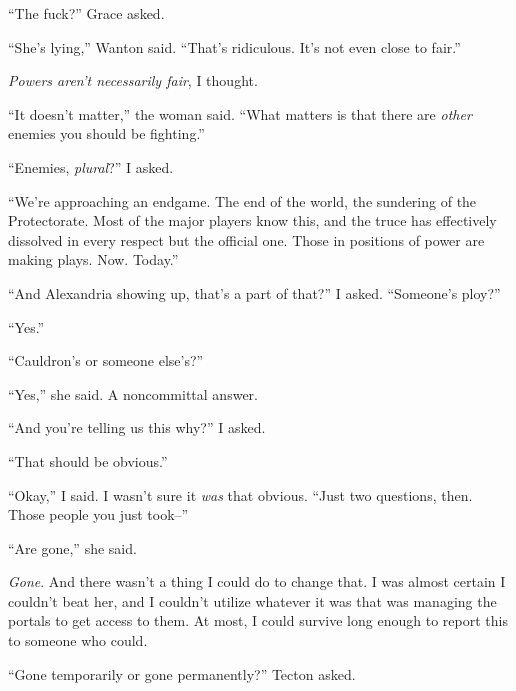 ``The fuck?'' Grace asked.



``She's lying,'' Wanton said.  ``That's ridiculous.  It's not even close to fair.''



\emph{Powers aren't necessarily fair}, I thought.



``It doesn't matter,'' the woman said.  ``What matters is that there are \emph{other} enemies you should be fighting.''



``Enemies, \emph{plural}?'' I asked.



``We're approaching an endgame.  The end of the world, the sundering of the Protectorate.  Most of the major players know this, and the truce has effectively dissolved in every respect but the official one.  Those in positions of power are making plays.  Now.  Today.''



``And Alexandria showing up, that's a part of that?''  I asked.  ``Someone's ploy?''



``Yes.''



``Cauldron's or someone else's?''



``Yes,'' she said.  A noncommittal answer.



``And you're telling us this why?'' I asked.



``That should be obvious.''



``Okay,'' I said.  I wasn't sure it \emph{was} that obvious.  ``Just two questions, then.  Those people you just took--''



``Are gone,'' she said.



\emph{Gone}.  And there wasn't a thing I could do to change that.  I was almost certain I couldn't beat her, and I couldn't utilize whatever it was that was managing the portals to get access to them.  At most, I could survive long enough to report this to someone who could.



``Gone temporarily or gone permanently?'' Tecton asked.



